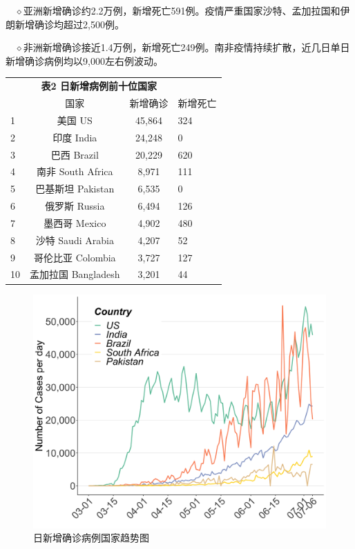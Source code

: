 \documentclass[
]{article}
\begin{document}
\(\quad\)\(\diamond\)亚洲新增确诊约2.2万例，新增死亡591例。疫情严重国家沙特、孟加拉国和伊朗新增确诊均超过2,500例。

\(\quad\)\(\diamond\)非洲新增确诊接近1.4万例，新增死亡249例。南非疫情持续扩散，近几日单日新增确诊病例均以9,000左右例波动。

\begin{table}[H]
    \centering \begin{table}[H]
\centering\begingroup\fontsize{20}{22}\selectfont

\begin{tabular}{lccl}
\toprule
\multicolumn{0}{c}{\textbf{ }} & \multicolumn{2}{c}{\textbf{表2 日新增病例前十位国家}} \\
  & 国家 & 新增确诊 & 新增死亡\\
\midrule
\rowcolor{gray!6}  1 & 美国 US & 45,864 & 324\\
2 & 印度 India & 24,248 & 0\\
\rowcolor{gray!6}  3 & 巴西 Brazil & 20,229 & 620\\
4 & 南非 South Africa & 8,971 & 111\\
\rowcolor{gray!6}  5 & 巴基斯坦 Pakistan & 6,535 & 0\\
6 & 俄罗斯 Russia & 6,494 & 126\\
\rowcolor{gray!6}  7 & 墨西哥 Mexico & 4,902 & 480\\
8 & 沙特 Saudi Arabia & 4,207 & 52\\
\rowcolor{gray!6}  9 & 哥伦比亚 Colombia & 3,727 & 127\\
10 & 孟加拉国 Bangladesh & 3,201 & 44\\
\bottomrule
\end{tabular}
\endgroup{}
\end{table} \end{table}
\vspace{-5mm}
\begin{figure}[H]
\centering
{}
\caption{日新增确诊病例国家趋势图}
\includegraphics[]{./input/covid2.png}
\end{figure}
\end{document}
